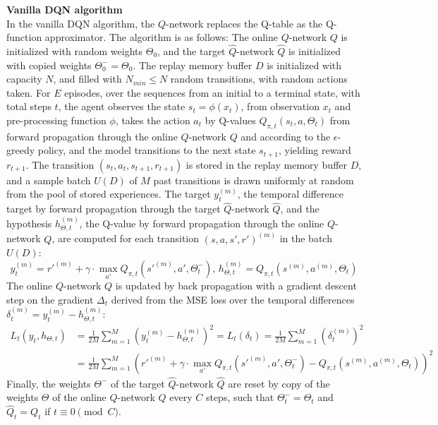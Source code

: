 \textbf{Vanilla DQN algorithm} \\
In the vanilla DQN algorithm, the $Q$-network replaces the Q-table as the Q-function approximator. The algorithm is as follows: The online $Q$-network $Q$ is initialized with random weights $\Theta_0$, and the target $\hat{Q}$-network $\hat{Q}$ is initialized with copied weights $\Theta^-_0=\Theta_0$. The replay memory buffer $D$ is initialized with capacity $N$, and  filled with $N_{min} \leq N$ random transitions, with random actions taken. For $E$ episodes, over the sequences from an initial to a terminal state, with total steps $t$, the agent observes the state $s_t=\phi(x_t)$, from observation $x_t$ and pre-processing function $\phi$, takes the action $a_t$ by Q-values $Q_{\pi,t}(s_t,a,\Theta_t)$ from forward propagation through the online $Q$-network $Q$ and according to the $\epsilon$-greedy policy, and the model transitions to the next state $s_{t+1}$, yielding reward $r_{t+1}$. The transition $(s_t,a_t,s_{t+1},r_{t+1})$ is stored in the replay memory buffer $D$, and a sample batch $U(D)$ of $M$ past transitions is drawn uniformly at random from the pool of stored experiences. The target $y^{(m)}_t$, the temporal difference target by forward propagation through the target $\hat{Q}$-network $\hat{Q}$, and the hypothesis $h_{\Theta,t}^{(m)}$, the Q-value by forward propagation through the online $Q$-network $Q$, are computed for each transition $(s,a,s',r')^{(m)}$ in the batch $U(D)$:
\[ y^{(m)}_t = r'^{(m)} + \gamma \cdot \max_{a'}Q_{\pi,t}(s'^{(m)},a',\Theta^-_t) \text{, } h_{\Theta,t}^{(m)} = Q_{\pi,t}(s^{(m)},a^{(m)},\Theta_t) \]
The online $Q$-network $Q$ is updated by back propagation with a gradient descent step on the gradient $\Delta_t$ derived from the MSE loss over the temporal differences $\delta^{(m)}_t = y^{(m)}_t - h_{\Theta,t}^{(m)}$:
\[
\begin{split}
 L_t(y_t,h_{\Theta,t}) &= \frac{1}{2M}\sum_{m=1}^M (y^{(m)}_t - h_{\Theta,t}^{(m)})^2 = L_t(\delta_t) = \frac{1}{2M}\sum_{m=1}^M (\delta_t^{(m)})^2 \\
 &= \frac{1}{2M}\sum_{m=1}^M (r'^{(m)} + \gamma \cdot \max_{a'}Q_{\pi,t}(s'^{(m)},a',\Theta^-_t) - Q_{\pi,t}(s^{(m)},a^{(m)},\Theta_t))^2
\end{split}
\]
Finally, the weights $\Theta^-$ of the target $\hat{Q}$-network $\hat{Q}$ are reset by copy of the weights $\Theta$ of the online $Q$-network $Q$ every $C$ steps, such that $\Theta^-_t = \Theta_t$ and $\hat{Q}_t = Q_t$ if $t \equiv 0 \pmod{C}$.

